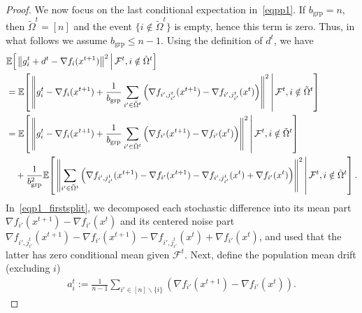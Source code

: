 \documentclass{article}
\newcommand{\sqn}[1]{\left\| #1 \right\|^2}
\newcommand{\eqdef}{:=}
\newcommand{\Prob}{\mathbf{Prob}}
\newcommand{\Expb}[2]{\mathbb{E}\!\left[\left. #1\,\right|#2 \right]}
\theoremstyle{plain}
\begin{document}
\begin{proof}
We now focus on the last conditional expectation in~\eqref{eqpp1}. If $b_{\mathrm{grp}}=n$, then $\tilde{\Omega}^t=[n]$ and the event $\{i\notin\tilde{\Omega}^t\}$ is empty, hence this term is zero. Thus, in what follows we assume $b_{\mathrm{grp}}\leq n-1$. Using the definition of $d^t$, we have
\begin{align}
&\Expb{\sqn{g_i^{t}+d^t-\nabla f_i(x^{t+1})}}{\mathcal{F}^t, i\notin\tilde{\Omega}^t}\notag\\
&=\Expb{\sqn{g_i^{t}-\nabla f_i(x^{t+1})+\frac{1}{b_{\mathrm{grp}}}\sum_{i'\in \tilde{\Omega}^t}\Big(\nabla f_{i',j_{i'}^t}(x^{t+1})-\nabla f_{i',j_{i'}^t}(x^{t})\Big)}}{\mathcal{F}^t, i\notin\tilde{\Omega}^t}\notag\\
&=\Expb{\sqn{g_i^{t}-\nabla f_i(x^{t+1})+\frac{1}{b_{\mathrm{grp}}}\sum_{i'\in \tilde{\Omega}^t}\Big(\nabla f_{i'}(x^{t+1})-\nabla f_{i'}(x^{t})\Big)}}{\mathcal{F}^t, i\notin\tilde{\Omega}^t}\notag\\
&\quad +\frac{1}{b_{\mathrm{grp}}^2} \Expb{\sqn{\sum_{i'\in \tilde{\Omega}^t} \Big(\nabla f_{i',j_{i'}^t}(x^{t+1})- \nabla f_{i'}(x^{t+1})-\nabla f_{i',j_{i'}^t}(x^{t})+\nabla f_{i'}(x^{t})\Big)}}{\mathcal{F}^t, i\notin\tilde{\Omega}^t}.
\label{eqp1_firstsplit}
\end{align}
In~\eqref{eqp1_firstsplit}, we decomposed each stochastic difference into its mean part
$\nabla f_{i'}(x^{t+1})-\nabla f_{i'}(x^{t})$ and its centered noise part
$\nabla f_{i',j_{i'}^t}(x^{t+1})-\nabla f_{i'}(x^{t+1})-\nabla f_{i',j_{i'}^t}(x^{t})+\nabla f_{i'}(x^{t})$,
and used that the latter has zero conditional mean given $\mathcal{F}^t$. Next, define the population mean drift (excluding $i$)
\begin{align*}
a_i^{t}\eqdef \frac{1}{n-1}\sum_{i'\in [n]\backslash\{i\}} \left(\nabla f_{i'}(x^{t+1})-\nabla f_{i'}(x^{t})\right).
\end{align*}




\end{proof}
\end{document}
